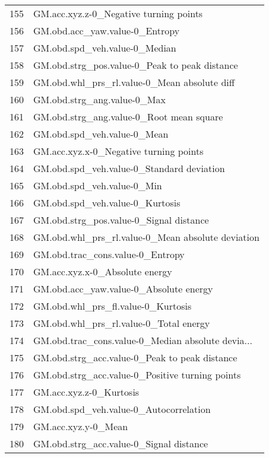 \begin{tabular}{ll}
155 &             GM.acc.xyz.z-0\_Negative turning points \\
156 &                     GM.obd.acc\_yaw.value-0\_Entropy \\
157 &                      GM.obd.spd\_veh.value-0\_Median \\
158 &      GM.obd.strg\_pos.value-0\_Peak to peak distance \\
159 &       GM.obd.whl\_prs\_rl.value-0\_Mean absolute diff \\
160 &                        GM.obd.strg\_ang.value-0\_Max \\
161 &           GM.obd.strg\_ang.value-0\_Root mean square \\
162 &                        GM.obd.spd\_veh.value-0\_Mean \\
163 &             GM.acc.xyz.x-0\_Negative turning points \\
164 &          GM.obd.spd\_veh.value-0\_Standard deviation \\
165 &                         GM.obd.spd\_veh.value-0\_Min \\
166 &                    GM.obd.spd\_veh.value-0\_Kurtosis \\
167 &            GM.obd.strg\_pos.value-0\_Signal distance \\
168 &  GM.obd.whl\_prs\_rl.value-0\_Mean absolute deviation \\
169 &                   GM.obd.trac\_cons.value-0\_Entropy \\
170 &                     GM.acc.xyz.x-0\_Absolute energy \\
171 &             GM.obd.acc\_yaw.value-0\_Absolute energy \\
172 &                 GM.obd.whl\_prs\_fl.value-0\_Kurtosis \\
173 &             GM.obd.whl\_prs\_rl.value-0\_Total energy \\
174 &  GM.obd.trac\_cons.value-0\_Median absolute devia... \\
175 &      GM.obd.strg\_acc.value-0\_Peak to peak distance \\
176 &    GM.obd.strg\_acc.value-0\_Positive turning points \\
177 &                            GM.acc.xyz.z-0\_Kurtosis \\
178 &             GM.obd.spd\_veh.value-0\_Autocorrelation \\
179 &                                GM.acc.xyz.y-0\_Mean \\
180 &            GM.obd.strg\_acc.value-0\_Signal distance \\

\end{tabular}
